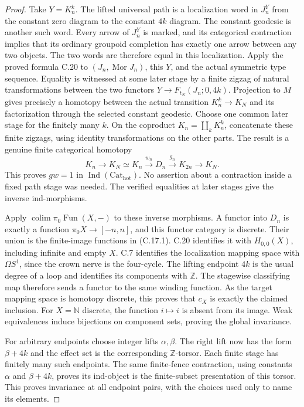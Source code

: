 \begin{proof}
Take $Y=K_n^k$. The lifted universal path is a localization word
in $J_n^Y$ from the constant zero diagram to the constant $4k$
diagram. The constant geodesic is another such word. Every arrow
of $J_n^Y$ is marked, and its categorical contraction implies
that its ordinary groupoid completion has exactly one arrow
between any two objects. The two words are therefore equal in
this localization. Apply the proved formula C.20 to
$(J_n,\operatorname{Mor}J_n)$, this $Y$, and the actual
symmetric type sequence. Equality is witnessed at some later
stage by a finite zigzag of natural transformations between the
two functors $Y\to F_{t_N}(J_n;0,4k)$. Projection to $M$
gives precisely a homotopy between the actual transition
$K_n^k\to K_N$ and its factorization through the selected
constant geodesic. Choose one common later stage for the finitely
many $k$. On the coproduct $K_n=\coprod_kK_n^k$, concatenate
these finite zigzags, using identity transformations on the other
parts. The result is a genuine finite categorical homotopy
\[
 K_n\longrightarrow K_N
       \simeq K_n\xrightarrow{w_n}D_n
                     \xrightarrow{g_n}K_{2n}\longrightarrow K_N.
\]
This proves $gw=1$ in $\operatorname{Ind}(\mathrm{Cat}_{\mathrm{hot}})$.
No assertion about a contraction inside a fixed path stage was
needed. The verified equalities at later stages give the inverse
ind-morphisms.

Apply $\operatorname{colim}\pi_0\operatorname{Fun}(X,-)$ to
these inverse morphisms. A functor into $D_n$ is exactly a
function $\pi_0X\to[-n,n]$, and this functor category is
discrete. Their union is the finite-image functions in (C.17.1).
C.20 identifies it with $H_{0,0}(X)$, including infinite and
empty $X$. C.7 identifies the localization mapping space with
$\Omega S^1$, since the crown nerve is the four-cycle. The
lifting endpoint $4k$ is the usual degree of a loop and identifies
its components with $\mathbb Z$. The stagewise classifying map
therefore sends a functor to the same winding function. As the
target mapping space is homotopy discrete, this proves that
$c_X$ is exactly the claimed inclusion. For $X=\mathbb N$
discrete, the function $i\mapsto i$ is absent from its image.
Weak equivalences induce bijections on component sets, proving
the global invariance.

For arbitrary endpoints choose integer lifts $\alpha,\beta$.
The right lift now has the form $\beta+4k$ and the effect set is
the corresponding $\mathbb Z$-torsor. Each finite stage has
finitely many such endpoints. The same finite-fence contraction,
using constants $\alpha$ and $\beta+4k$, proves its ind-object
is the finite-subset presentation of this torsor. This proves
invariance at all endpoint pairs, with the choices used only to
name its elements.


\end{proof}
